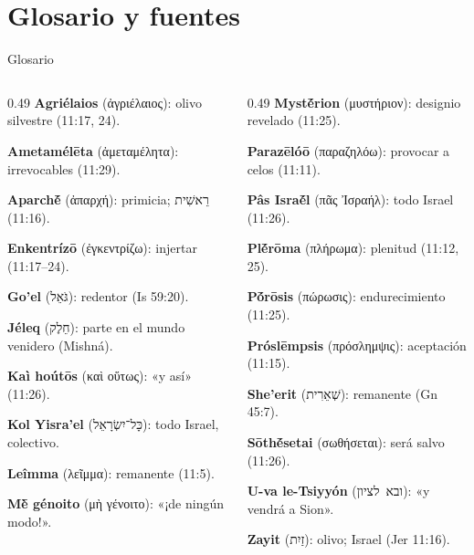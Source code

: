 \documentclass[hyperref={bookmarks=false},aspectratio=169]{beamer}
\newcommand{\heb}[1]{\mbox{\foreignlanguage{hebrew}{#1}}}
\newcommand{\grc}[1]{\foreignlanguage{ancientgreek}{#1}}
\begin{document}
\section{Glosario y fuentes}
\begin{frame}{Glosario}
\begin{columns}[T,onlytextwidth]
\begin{column}{0.49\textwidth}\scriptsize
\textbf{Agriélaios} (\grc{ἀγριέλαιος}): olivo silvestre (11:17, 24).\par\smallskip
\textbf{Ametamélēta} (\grc{ἀμεταμέλητα}): irrevocables (11:29).\par\smallskip
\textbf{Aparchḗ} (\grc{ἀπαρχή}): primicia; \heb{רֵאשִׁית} (11:16).\par\smallskip
\textbf{Enkentrízō} (\grc{ἐγκεντρίζω}): injertar (11:17--24).\par\smallskip
\textbf{Go'el} (\heb{גֹּאֵל}): redentor (Is 59:20).\par\smallskip
\textbf{Jéleq} (\heb{חֵלֶק}): parte en el mundo venidero (Mishná).\par\smallskip
\textbf{Kaì hoútōs} (\grc{καὶ οὕτως}): «y así» (11:26).\par\smallskip
\textbf{Kol Yisra'el} (\heb{כָּל־יִשְׂרָאֵל}): todo Israel, colectivo.\par\smallskip
\textbf{Leîmma} (\grc{λεῖμμα}): remanente (11:5).\par\smallskip
\textbf{Mḕ génoito} (\grc{μὴ γένοιτο}): «¡de ningún modo!».
\end{column}
\begin{column}{0.49\textwidth}\scriptsize
\textbf{Mystḗrion} (\grc{μυστήριον}): designio revelado (11:25).\par\smallskip
\textbf{Parazēlóō} (\grc{παραζηλόω}): provocar a celos (11:11).\par\smallskip
\textbf{Pâs Israḗl} (\grc{πᾶς Ἰσραήλ}): todo Israel (11:26).\par\smallskip
\textbf{Plḗrōma} (\grc{πλήρωμα}): plenitud (11:12, 25).\par\smallskip
\textbf{Pṓrōsis} (\grc{πώρωσις}): endurecimiento (11:25).\par\smallskip
\textbf{Próslēmpsis} (\grc{πρόσλημψις}): aceptación (11:15).\par\smallskip
\textbf{She'erit} (\heb{שְׁאֵרִית}): remanente (Gn 45:7).\par\smallskip
\textbf{Sōthḗsetai} (\grc{σωθήσεται}): será salvo (11:26).\par\smallskip
\textbf{U-va le-Tsiyyón} (\heb{ובא לציון}): «y vendrá a Sion».\par\smallskip
\textbf{Zayit} (\heb{זַיִת}): olivo; Israel (Jer 11:16).
\end{column}
\end{columns}
\end{frame}
\end{document}
